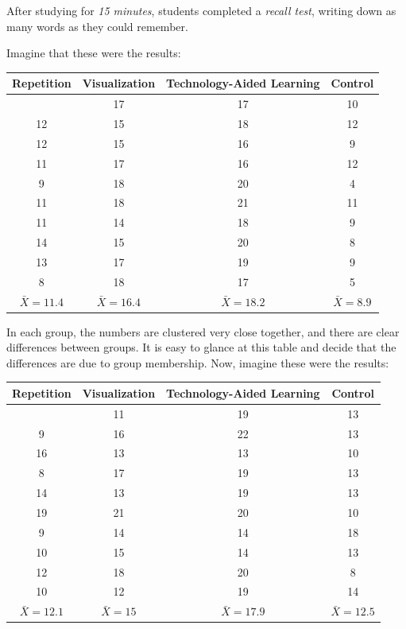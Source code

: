 \documentclass[
  letterpaper,
  DIV=11,
  numbers=noendperiod]{scrreprt}
\begin{document}
After studying for \emph{15 minutes}, students completed a \emph{recall
test}, writing down as many words as they could remember.

Imagine that these were the results:\,

\begin{longtable}[]{@{}cccc@{}}
\toprule\noalign{}
Repetition & Visualization & Technology-Aided Learning & Control \\
\midrule\noalign{}
\endhead
\bottomrule\noalign{}
\endlastfoot
13 & 17 & 17 & 10 \\
12 & 15 & 18 & 12 \\
12 & 15 & 16 & 9 \\
11 & 17 & 16 & 12 \\
9 & 18 & 20 & 4 \\
11 & 18 & 21 & 11 \\
11 & 14 & 18 & 9 \\
14 & 15 & 20 & 8 \\
13 & 17 & 19 & 9 \\
8 & 18 & 17 & 5 \\
\(\bar{X}=11.4\) & \(\bar{X}=16.4\) & \(\bar{X}=18.2\) &
\(\bar{X}=8.9\) \\
\end{longtable}

In each group, the numbers are clustered very close together, and there
are clear differences between groups. It is easy to glance at this table
and decide that the differences are due to group membership. Now,
imagine these were the results:

\begin{longtable}[]{@{}cccc@{}}
\toprule\noalign{}
Repetition & Visualization & Technology-Aided Learning & Control \\
\midrule\noalign{}
\endhead
\bottomrule\noalign{}
\endlastfoot
14 & 11 & 19 & 13 \\
9 & 16 & 22 & 13 \\
16 & 13 & 13 & 10 \\
8 & 17 & 19 & 13 \\
14 & 13 & 19 & 13 \\
19 & 21 & 20 & 10 \\
9 & 14 & 14 & 18 \\
10 & 15 & 14 & 13 \\
12 & 18 & 20 & 8 \\
10 & 12 & 19 & 14 \\
\(\bar{X}=12.1\) & \(\bar{X}=15\) & \(\bar{X}=17.9\) &
\(\bar{X}=12.5\) \\
\end{longtable}
\end{document}
